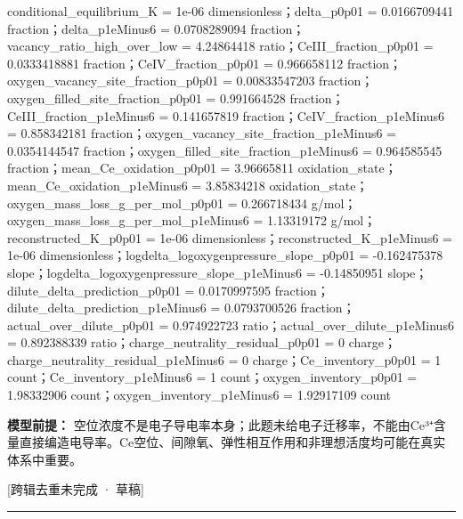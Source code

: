 \documentclass[UTF8,11pt,a4paper]{ctexart}
\begin{document}
conditional\_equilibrium\_K = 1e-06 dimensionless；delta\_p0p01 = 0.0166709441 fraction；delta\_p1eMinus6 = 0.0708289094 fraction；vacancy\_ratio\_high\_over\_low = 4.24864418 ratio；CeIII\_fraction\_p0p01 = 0.0333418881 fraction；CeIV\_fraction\_p0p01 = 0.966658112 fraction；oxygen\_vacancy\_site\_fraction\_p0p01 = 0.00833547203 fraction；oxygen\_filled\_site\_fraction\_p0p01 = 0.991664528 fraction；CeIII\_fraction\_p1eMinus6 = 0.141657819 fraction；CeIV\_fraction\_p1eMinus6 = 0.858342181 fraction；oxygen\_vacancy\_site\_fraction\_p1eMinus6 = 0.0354144547 fraction；oxygen\_filled\_site\_fraction\_p1eMinus6 = 0.964585545 fraction；mean\_Ce\_oxidation\_p0p01 = 3.96665811 oxidation\_state；mean\_Ce\_oxidation\_p1eMinus6 = 3.85834218 oxidation\_state；oxygen\_mass\_loss\_g\_per\_mol\_p0p01 = 0.266718434 g/mol；oxygen\_mass\_loss\_g\_per\_mol\_p1eMinus6 = 1.13319172 g/mol；reconstructed\_K\_p0p01 = 1e-06 dimensionless；reconstructed\_K\_p1eMinus6 = 1e-06 dimensionless；logdelta\_logoxygenpressure\_slope\_p0p01 = -0.162475378 slope；logdelta\_logoxygenpressure\_slope\_p1eMinus6 = -0.14850951 slope；dilute\_delta\_prediction\_p0p01 = 0.0170997595 fraction；dilute\_delta\_prediction\_p1eMinus6 = 0.0793700526 fraction；actual\_over\_dilute\_p0p01 = 0.974922723 ratio；actual\_over\_dilute\_p1eMinus6 = 0.892388339 ratio；charge\_neutrality\_residual\_p0p01 = 0 charge；charge\_neutrality\_residual\_p1eMinus6 = 0 charge；Ce\_inventory\_p0p01 = 1 count；Ce\_inventory\_p1eMinus6 = 1 count；oxygen\_inventory\_p0p01 = 1.98332906 count；oxygen\_inventory\_p1eMinus6 = 1.92917109 count\par
\noindent\textbf{模型前提：}
空位浓度不是电子导电率本身；此题未给电子迁移率，不能由Ce³⁺含量直接编造电导率。Ce空位、间隙氧、弹性相互作用和非理想活度均可能在真实体系中重要。\par
\noindent\textcolor{red!65!black}{[跨辑去重未完成 · 草稿]} \par
\medskip\hrule\medskip
{}
\end{document}
